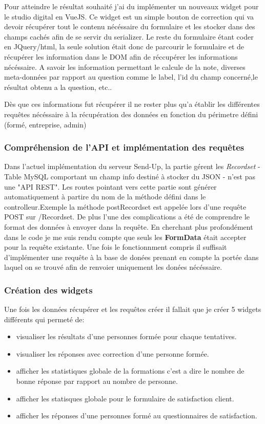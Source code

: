 Pour atteindre le résultat souhaité j'ai du implémenter un nouveaux widget pour le studio digital en VueJS. Ce widget est un simple bouton de correction qui va devoir récupérer tout le contenu nécéssaire du formulaire et les stocker dans des champs cachés afin de se servir du serializer. Le reste du formulaire étant coder en JQuery/html, la seule solution était donc de parcourir le formulaire et de récupérer les information dans le DOM afin de réccupérer les informations nécéssaire. A savoir les information permettant le calcule de la note, diverses meta-données par rapport au question comme le label, l'id du champ concerné,le résultat obtenu a la question, etc.. 

Dès que ces informations fut récupérer il ne rester plus qu'a établir les différentes requêtes nécéssaire à la récupération des données en fonction du périmetre défini (formé, entreprise, admin)


\subsubsection{Compréhension de l'API et implémentation des requêtes}

Dans l'actuel implémentation du serveur Send-Up, la partie gérent les \textit{Recordset} - Table MySQL comportant un champ info destiné à stocker du JSON - n'est pas une "API REST". Les routes pointant vers cette partie sont générer automatiquement à partire du nom de la méthode défini dans le controlleur.Exemple la méthode postRecordset est appelée lors d'une requête POST sur /Recordset. De plus l'une des complications a été de comprendre le format des données à envoyer dans la requête. En cherchant plus profondément dans le code je me suis rendu compte que seuls les \textbf{FormData} était accepter pour la requête existante.
Une fois le fonctionnment compris il suffisait d'implémenter une requête à la base de donées prenant en compte la portée dans laquel on se trouvé afin de renvoier uniquement les donées nécéssaire.

\subsubsection{Création des widgets}

Une fois les données récupérer et les requêtes créer il fallait que je créer 5 widgets différents qui permeté de: 
\begin{itemize}
    \item visualiser les résultats d'une personnes formée pour chaque tentatives. 
    \item  visualiser les réponses avec correction d'une personne formée.
    \item afficher les statistiques globale de la formations c'est a dire le nombre de bonne réponse par rapport au nombre de personne.
    \item afficher les statisques globale pour le formulaire de satisfaction client. 
    \item afficher les réponses d'une personnes formé au questionnaires de satisfaction.  
\end{itemize}